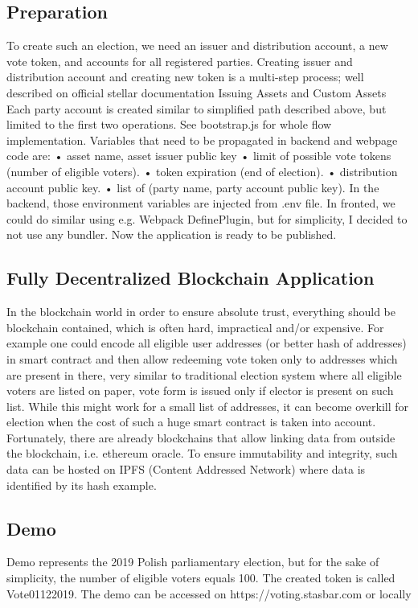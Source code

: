 \documentclass[runningheads]{llncs}
\begin{document}
\subsection{Preparation}
To create such an election, we need an issuer and distribution account, a new vote token, and accounts for all registered parties. Creating issuer and distribution account and creating new token is a multi-step process; well described on official stellar documentation Issuing Assets and Custom Assets Each party account is created similar to simplified path described above, but limited to the first two operations. See bootstrap.js for whole flow implementation. Variables that need to be propagated in backend and webpage code are:
• asset name, asset issuer public key
• limit of possible vote tokens (number of eligible voters). • token expiration (end of election).
• distribution account public key.
• list of (party name, party account public key).
In the backend, those environment variables are injected from .env file. In fronted, we could do similar using e.g. Webpack DefinePlugin, but for simplicity, I decided to not use any bundler.
Now the application is ready to be published.

\subsection{Fully Decentralized Blockchain Application}
In the blockchain world in order to ensure absolute trust, everything should be blockchain contained, which is often hard, impractical and/or expensive. For example one could encode all eligible user addresses (or better hash of addresses) in smart contract and then allow redeeming vote token only to addresses which are present in there, very similar to traditional election system where all eligible voters are listed on paper, vote form is issued only if elector is present on such list. While this might work for a small list of addresses, it can become overkill for election when the cost of such a huge smart contract is taken into account. Fortunately, there are already blockchains that allow linking data from outside the blockchain, i.e. ethereum oracle. To ensure immutability and integrity, such data can be hosted on IPFS (Content Addressed Network) where data is identified by its hash example.

\subsection{Demo}
Demo represents the 2019 Polish parliamentary election, but for the sake of simplicity, the number of eligible voters equals 100. The created token is called Vote01122019. The demo can be accessed on https://voting.stasbar.com or locally
\end{document}
